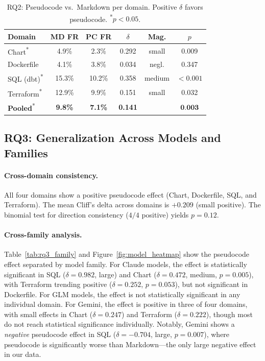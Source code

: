 \documentclass[sigconf,nonacm]{acmart}
\begin{document}
\begin{table}[t]
\caption{RQ2: Pseudocode vs.\ Markdown per domain. Positive $\delta$ favors
pseudocode. \textsuperscript{*}$p < 0.05$.}
\label{tab:rq2}
\centering\small
\begin{tabular}{lccccc}
\toprule
\textbf{Domain} & \textbf{MD FR} & \textbf{PC FR} & \textbf{$\delta$} & \textbf{Mag.} & \textbf{$p$} \\
\midrule
Chart\textsuperscript{*} & 4.9\% & 2.3\% & 0.292 & small & 0.009 \\
Dockerfile & 4.1\% & 3.8\% & 0.034 & negl. & 0.347 \\
SQL (dbt)\textsuperscript{*} & 15.3\% & 10.2\% & 0.358 & medium & $< 0.001$ \\
Terraform\textsuperscript{*} & 12.9\% & 9.9\% & 0.151 & small & 0.032 \\
\midrule
\textbf{Pooled}\textsuperscript{*} & \textbf{9.8\%} & \textbf{7.1\%} & \textbf{0.141} & & $\textbf{0.003}$ \\
\bottomrule
\end{tabular}
\end{table}


\subsection{RQ3: Generalization Across Models and Families}\label{sec:rq3}

\paragraph{Cross-domain consistency.}
All four domains show a positive pseudocode effect (Chart, Dockerfile,
SQL, and Terraform). The mean
Cliff's delta across domains is $+0.209$ (small positive). The binomial test
for direction consistency ($4/4$ positive) yields $p = 0.12$.

\paragraph{Cross-family analysis.}
Table~\ref{tab:rq3_family} and Figure~\ref{fig:model_heatmap} show the
pseudocode effect separated by model family. For Claude models, the effect is
statistically significant in SQL
($\delta = 0.982$, large) and Chart ($\delta = 0.472$, medium, $p = 0.005$),
with Terraform trending positive ($\delta = 0.252$,
$p = 0.053$), but not significant in Dockerfile. For GLM models, the effect is not statistically
significant in any individual domain. For Gemini, the effect is positive in three of four domains, with small
effects in Chart ($\delta = 0.247$) and Terraform ($\delta = 0.222$),
though most do not reach statistical significance individually. Notably,
Gemini shows a \emph{negative} pseudocode effect in SQL
($\delta = -0.704$, large, $p = 0.007$), where pseudocode is significantly
worse than Markdown---the only large negative effect in our data.
\end{document}
